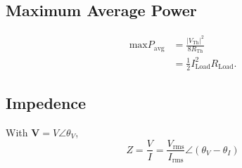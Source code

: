 \documentclass[letterpaper]{scrartcl}
\newcommand{\figspace}{\vspace{1.5\baselineskip}}
\newcommand{\sectionspace}{\vspace{3\baselineskip}}
\newcommand{\lr}[1]{\left(#1\right)}
\newcommand{\inv}[1]{\frac{1}{#1}}
\newcommand{\phasor}[1]{\mathbf{#1}}
\newcommand{\thev}[0]{\mathrm{Th}}
\newcommand{\load}[0]{\mathrm{Load}}
\newcommand{\Max}[0]{\mathrm{max}}
\newcommand{\Avg}[0]{\mathrm{avg}}
\newcommand{\rms}[0]{\mathrm{rms}}
\newcommand{\Abs}[1]{{\left\lvert{#1}\right\rvert}}
\begin{document}
\WFclear
\figspace
\sectionspace

\subsection*{Maximum Average Power}
\begin{equation}\label{eqn:karlCircuitsCheatSheet:760}
\begin{aligned}
\Max P_\Avg
&= \frac{\Abs{V_\thev}^2}{8 R_\thev } \\
&= \inv{2} I_\load^2 R_\load.
\end{aligned}
\end{equation}

\subsection*{Impedence}
With \( \phasor{V} = V \angle \theta_V \),
\begin{equation}\label{eqn:karlCircuitsCheatSheet:780}
Z = \frac{V}{I} = \frac{V_\rms}{I_\rms} \angle \lr{ \theta_V - \theta_I }
\end{equation}
\end{document}
